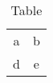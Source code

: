 \documentclass{article}
\begin{document}
\begin{table}
  \begin{tabular}{|c|c|}
    a & b \\
    d & e
  \end{tabular}
  \caption{Table}
\end{table}
\end{document}
